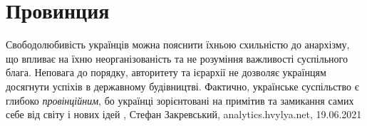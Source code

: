  
 
 
 
 
\chapter{Провинция}
\label{sec:slova.provincia}

Свободолюбивість українців можна пояснити їхньою схильністю до анархізму, що
впливає на їхню неорганізованість та не розуміння важливості суспільного блага.
Неповага до порядку, авторитету та ієрархії не дозволяє українцям досягнути
успіхів в державному будівництві. Фактично, українське суспільство є глибоко
\emph{провінційним}, бо українці зорієнтовані на примітив та замикання самих себе від
світу і нових ідей
, Стефан Закревський, 
analytics.hvylya.net, 19.06.2021

